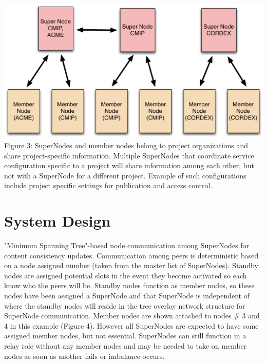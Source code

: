 \documentclass[oneside,12pt]{memoir}
\begin{document}
\begin{center}
\includegraphics[width=\textwidth]{presentation/ESG-node-org.pdf}
Figure 3: SuperNodes and member nodes belong to project organizations and share project-specific information.   Multiple SuperNodes that coordinate service configuration specific to a project will share information among each other, but not with a SuperNode for a different project.  Example of such configurations include project specific settings for publication and access control.
\end{center}

\section{System Design}
\label{sysd}

"Minimum Spanning Tree"-based node communication among SuperNodes for content consistency updates.  Communication among peers is deterministic based on a node assigned number (taken from the master list of SuperNodes).     Standby nodes are assigned potential slots in the event they become activated so each know who the peers will be.  Standby nodes function as member nodes, so these nodes have been assigned a SuperNode and that SuperNode is independent of where the standby nodes will reside in the tree overlay network structure for SuperNode communication.  Member nodes are shown attached to nodes \# 3 and 4 in this example (Figure 4).  However all SuperNodes are expected to have some assigned member nodes, but not essential.  SuperNodes can still function in a relay role without any member nodes and may be needed to take on member nodes as soon as another fails or imbalance occurs. 
\end{document}
